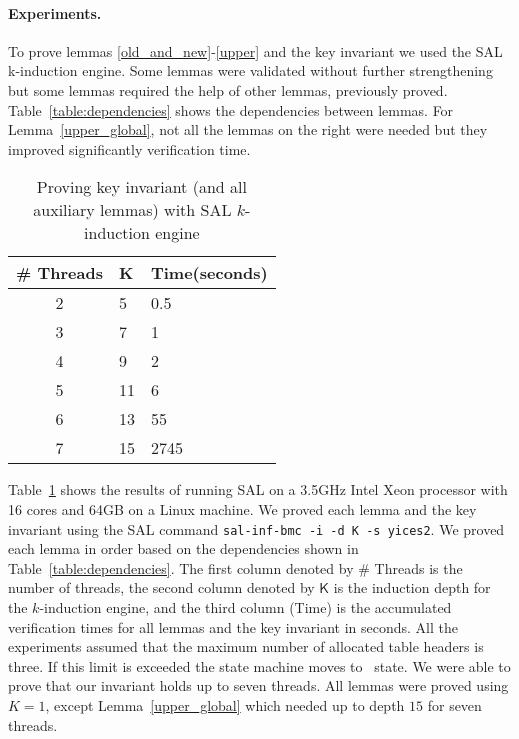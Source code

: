 \paragraph{Experiments.} To prove lemmas \ref{old_and_new}-\ref{upper} and the key invariant we used the SAL
k-induction engine. Some lemmas were validated without further
strengthening but some lemmas required the help of other lemmas,
previously proved. Table~\ref{table:dependencies} shows the
dependencies between lemmas. For Lemma~\ref{upper_global}, not all
the lemmas on the right were needed but they improved significantly
verification time.

\begin{table}[t]
  \begin{center}
    \begin{tabular}{|c|l|l|}
      \hline
      \textsf{\# Threads} & \textsf{K} & \textsf{Time(seconds)} \\
      \hline
      \hline           
      2 & 5  & 0.5\\
      \hline           
      3 & 7  & 1 \\
      \hline           
      4 & 9  & 2\\
      \hline           
      5 & 11 & 6 \\
      \hline           
      6 & 13 & 55 \\
      \hline           
      7 & 15 & 2745 \\      
      \hline 
    \end{tabular}
    \caption{Proving key invariant (and all auxiliary lemmas) with SAL $k$-induction engine}
    \label{sal-results}
    \end{center}
\end{table}


Table~\ref{sal-results} shows the results of running SAL on a 3.5GHz
Intel Xeon processor with 16 cores and 64GB on a Linux machine. We
proved each lemma and the key invariant using the SAL command
\texttt{sal-inf-bmc -i -d \textsf{K} -s yices2}. We proved each lemma in
order based on the dependencies shown in
Table~\ref{table:dependencies}.
%
The first column denoted by \textsf{\# Threads} is the number of
threads, the second column denoted by $\mathsf{K}$ is the induction
depth for the $k$-induction engine, and the third column
(\textsf{Time}) is the accumulated verification times for all lemmas
and the key invariant in seconds. All the experiments assumed that the
maximum number of allocated table headers is three. If this limit is exceeded
the state machine moves to \pcthree\ state.
%
We were able to prove that our invariant holds up to seven
threads. All lemmas were proved using $K=1$, except
Lemma~\ref{upper_global} which needed up to depth $15$ for seven
threads.
%




